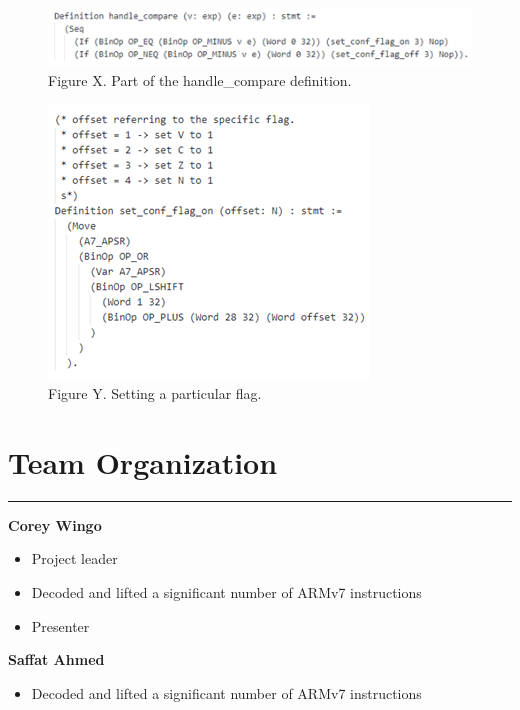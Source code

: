 \documentclass{article}
\begin{document}
\begin{figure}[h]
\includegraphics{handle_compare_definition.png}\\
Figure X. Part of the handle\_compare definition.
\centering
\end{figure}

\begin{figure}[h]
\includegraphics{set_flag_example.png}\\
Figure Y. Setting a particular flag.
\centering
\end{figure}

\clearpage %


\section*{Team Organization}
\vspace{0.3cm}
\hrule
\vspace{0.3cm}

\textbf{Corey Wingo}
\begin{itemize}
	\item Project leader
	\item Decoded and lifted a significant number of ARMv7 instructions
	\item Presenter\\
\end{itemize}


\textbf{Saffat Ahmed}
\begin{itemize}
	\item Decoded and lifted a significant number of ARMv7 instructions\\
\end{itemize}
\end{document}
